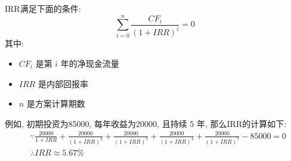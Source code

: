 IRR满足下面的条件:
\begin{equation}
    \sum_{i=0}^{n} \frac{CF_i}{(1 + IRR)^i} = 0
\end{equation}
其中:
\begin{itemize}
    \item $CF_i$ 是第 $i$ 年的净现金流量
    \item $IRR$ 是内部回报率
    \item $n$ 是方案计算期数
\end{itemize}

例如, 初期投资为85000, 每年收益为20000, 且持续 5 年, 那么IRR的计算如下:
\begin{equation}
    \begin{aligned}
     & \because \frac{20000}{1 + IRR} + \frac{20000}{(1 + IRR)^2} + \frac{20000}{(1 + IRR)^3} + \frac{20000}{(1 + IRR)^4} + \frac{20000}{(1 + IRR)^5} - 85000 = 0 \\
     & \therefore IRR \approx 5.67\%
\end{aligned}
\end{equation}

